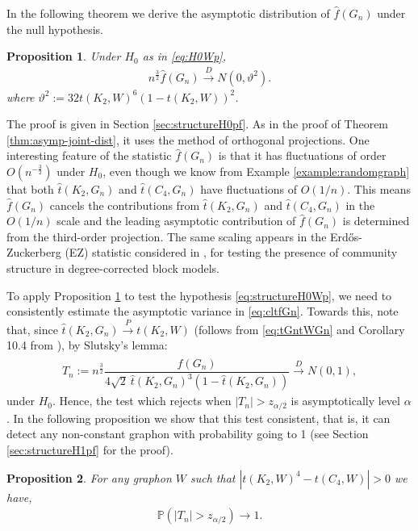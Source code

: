 \documentclass[11pt,reqno]{amsart}
\numberwithin{equation}{section}
\newtheorem{prop}{Proposition}[section]
\theoremstyle{definition}
\begin{document}
In the following theorem we derive the asymptotic distribution of $\hat f(G_n)$ under the null hypothesis.  

\begin{prop}\label{ppn:C4}
Under $H_0$ as in \eqref{eq:H0Wp}, 
\begin{align}\label{eq:cltfGn}
n^\frac{3}{2} \hat f(G_n) \overset{D} \rightarrow N\left(0, \vartheta^2 \right) . 
\end{align} 
where $\vartheta^2 := 32t(K_2, W)^{6}(1-t(K_2, W))^{2}$. 
\end{prop} 


The proof is given in Section \ref{sec:structureH0pf}. As in the proof of Theorem \ref{thm:asymp-joint-dist}, it uses the method of orthogonal projections. 
One interesting feature of the statistic $\hat f(G_n)$ is that it has fluctuations of order $O(n^{-\frac{3}{2}})$ under $H_0$, even though 
we know from  Example \ref{example:randomgraph} that both $\hat t(K_{2}, G_n)$ and  $\hat t(C_{4},G_n)$ have fluctuations of $O(1/n)$. This means $\hat f(G_n)$ cancels the contributions from $\hat t(K_{2}, G_n)$ and  $\hat t(C_{4},G_n)$ in the $O(1/n)$ scale and the leading asymptotic contribution of $\hat f(G_n)$ is determined from the third-order projection.  The same scaling appears in the Erd\H{o}s-Zuckerberg (EZ) statistic considered in \cite{gao2017testing}, for testing the presence of community structure in degree-corrected block models. 

To apply Proposition \ref{ppn:C4} to test the hypothesis \eqref{eq:structureH0Wp}, we need to consistently estimate the asymptotic variance in \eqref{eq:cltfGn}. Towards this, note that, since $\hat{t}(K_2, G_n) \stackrel{P} \rightarrow t(K_2, W)$ (follows from \eqref{eq:tGntWGn} and Corollary 10.4 from \cite{lovasz2012large}), by Slutsky's lemma: 
\begin{align}\label{eq:defTnstructure}
 T_n :=    n^\frac{3}{2}\dfrac{ \hat f (G_n)}{4\sqrt{2}\ \hat{t}(K_{2},G_n)^{3}(1- \hat{t}(K_{2},G_n))}\overset{D}{\rightarrow} N(0,1) , 
\end{align}
under $H_0$. Hence, the test which rejects when $|T_{n}| > z_{\alpha/2}$ is asymptotically level $\alpha$. 
In the following proposition we show that this test consistent, that is, it can detect any non-constant graphon with probability going to 1 (see Section \ref{sec:structureH1pf} for the proof).

\begin{prop}\label{prop:consistency}
For any graphon $W$ such that $|t(K_{2},W)^{4} - t(C_{4},W)|>0$ 
we have,
\begin{align*}
    \mathbb{P}\left(|T_{n}|> z_{\alpha/2} \right)\rightarrow 1. 
\end{align*} 
\end{prop} 
\end{document}
